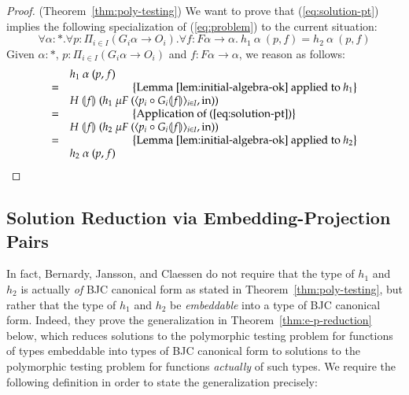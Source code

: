 \documentclass{article}[12 pt]
\newcommand{\fold}[1]{\llparenthesis #1 \rrparenthesis}
\newcommand{\eqAnnotation}[1]{\hspace{2cm}\left\{\textrm{#1}\right\}}
\theoremstyle{problemstyle}
\begin{document}
\begin{proof}
(Theorem~\ref{thm:poly-testing}) We want to prove that
  (\ref{eq:solution-pt}) implies the following specialization of
  (\ref{eq:problem}) to the current situation: 
  \begin{displaymath}
    \forall \alpha : *. \forall p : \Pi_{i \in I}(G_i\alpha \to
    O_i). \forall f : F\alpha \to \alpha.~h_1~\alpha~(p,f) =
    h_2~\alpha~(p,f)
  \end{displaymath}
  Given $\alpha : *$, $p : \Pi_{i \in I}(G_i\alpha \to O_i)$ and $f :
  F\alpha \to \alpha$, we reason as follows:
  \begin{displaymath}
    \begin{array}{cl}
       & h_1~\alpha~(p,f) \\
       =&\eqAnnotation{Lemma \ref{lem:initial-algebra-ok} applied to $h_1$} \\
       &H~\fold{f}~(h_1~\mu F~(\langle p_i \circ G_i\fold{f}
       \rangle_{i \in I}, \mathrm{in})) \\ 
       =&\eqAnnotation{Application of (\ref{eq:solution-pt})} \\
       &H~\fold{f}~(h_2~\mu F~(\langle p_i \circ G_i\fold{f}
       \rangle_{i \in I}, \mathrm{in})) \\ 
       =&\eqAnnotation{Lemma \ref{lem:initial-algebra-ok} applied to
         $h_2$} \\ 
       &h_2~\alpha~(p,f)
    \end{array}
  \end{displaymath}
\end{proof}

\subsection{Solution Reduction via Embedding-Projection Pairs}

In fact, Bernardy, Jansson, and Claessen do not require that the type
of $h_1$ and $h_2$ is actually {\em of} BJC canonical form as stated
in Theorem~\ref{thm:poly-testing}, but rather that the type of $h_1$
and $h_2$ be {\em embeddable} into a type of BJC canonical
form. Indeed, they prove the generalization in
Theorem~\ref{thm:e-p-reduction} below, which reduces solutions to the
polymorphic testing problem for functions of types embeddable into
types of BJC canonical form to solutions to the polymorphic testing
problem for functions {\em actually} of such types. We require the
following definition in order to state the generalization precisely:
\end{document}

